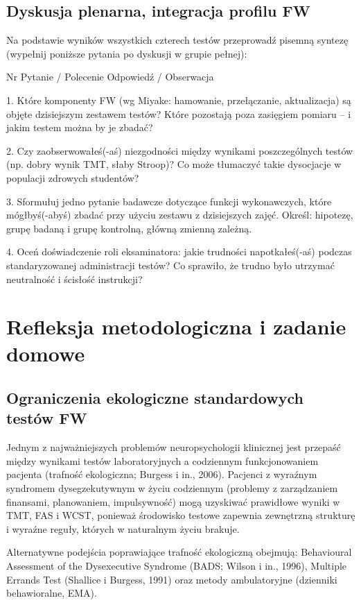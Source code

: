 \documentclass[11pt,a4paper]{article}
\begin{document}
\subsection{Dyskusja plenarna, integracja profilu FW}

Na podstawie wyników wszystkich czterech testów przeprowadź pisemną syntezę (wypełnij poniższe pytania po dyskusji w grupie pełnej):

Nr Pytanie / Polecenie Odpowiedź / Obserwacja

1. Które komponenty FW (wg Miyake: hamowanie, przełączanie, aktualizacja) są objęte dzisiejszym zestawem testów? Które pozostają poza zasięgiem pomiaru – i jakim testem można by je
zbadać?

2. Czy zaobserwowałeś(-aś) niezgodności między wynikami poszczególnych testów (np. dobry wynik TMT, słaby Stroop)? Co może tłumaczyć takie dysocjacje w populacji zdrowych studentów?

3. Sformułuj jedno pytanie badawcze dotyczące funkcji wykonawczych, które mógłbyś(-abyś) zbadać przy użyciu zestawu z dzisiejszych zajęć. Określ: hipotezę, grupę badaną i grupę kontrolną,
główną zmienną zależną.

4. Oceń doświadczenie roli eksaminatora: jakie trudności napotkałeś(-aś) podczas standaryzowanej administracji testów? Co sprawiło, że trudno było utrzymać neutralność i ścisłość instrukcji?

\section{Refleksja metodologiczna i zadanie domowe}

\subsection{Ograniczenia ekologiczne standardowych testów FW}
Jednym z najważniejszych problemów neuropsychologii klinicznej jest przepaść między wynikami testów laboratoryjnych a codziennym funkcjonowaniem pacjenta (trafność ekologiczna; Burgess i in., 2006). Pacjenci z wyraźnym syndromem dysegzekutywnym w życiu codziennym (problemy z zarządzaniem finansami, planowaniem, impulsywność) mogą uzyskiwać prawidłowe wyniki w TMT, FAS i WCST, ponieważ środowisko testowe zapewnia zewnętrzną strukturę i wyraźne reguły, których w naturalnym życiu brakuje.

Alternatywne podejścia poprawiające trafność ekologiczną obejmują: Behavioural Assessment of the Dysexecutive Syndrome (BADS; Wilson i in., 1996), Multiple Errands Test (Shallice i Burgess, 1991) oraz metody ambulatoryjne (dzienniki behawioralne, EMA).
\end{document}
